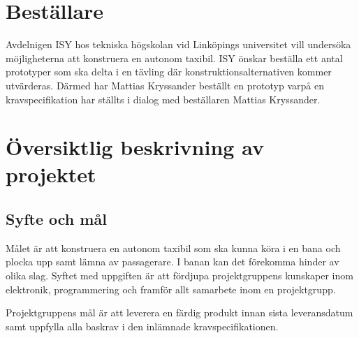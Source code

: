 \documentclass[projektplan/plan.tex]{subfiles}
\begin{document}
\section{Beställare}
Avdelnigen ISY hos tekniska högskolan vid Linköpings universitet vill undersöka möjligheterna
att konstruera en autonom taxibil. ISY önskar beställa ett antal prototyper som ska delta i en
tävling där konstruktionsalternativen kommer utvärderas. Därmed har Mattias Kryssander beställt 
en prototyp varpå en kravspecifikation har ställts i dialog med beställaren Mattias Kryssander.
\section{Översiktlig beskrivning av projektet}
\subsection{Syfte och mål}
Målet är att konstruera en autonom taxibil som ska kunna köra i en bana och
plocka upp samt lämna av passagerare. I banan kan det förekomma hinder av olika
slag. Syftet med uppgiften är att fördjupa projektgruppens kunskaper inom
elektronik, programmering och framför allt samarbete inom en projektgrupp.

Projektgruppens mål är att leverera en färdig produkt innan sista leveransdatum
samt uppfylla alla baskrav i den inlämnade kravspecifikationen.
\end{document}
